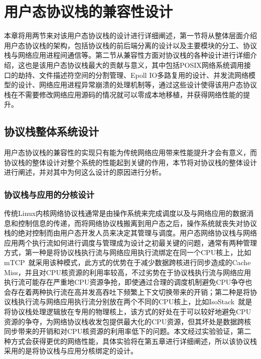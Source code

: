 \chapter{用户态协议栈的兼容性设计}

本章将用两节来对该用户态协议栈的设计进行详细阐述，第一节将从整体层面介绍用户态协议栈的架构，包括协议栈的前后端分离的设计以及主要模块的分工、协议栈与网络应用进程间通信等。第二节从兼容性方面对协议栈的各种设计进行详细介绍，这也是该用户态协议栈最大的贡献与意义，其中包括POSIX网络系统调用接口的劫持、文件描述符空间的分割管理、Epoll IO多路复用的设计、并发流网络模型的设计、网络应用进程异常崩溃的处理机制等，通过这些设计使得该用户态协议栈在不需要修改网络应用源码的情况就可以零成本地移植，并获得网络性能的提升。

\section{协议栈整体系统设计}

用户态协议栈的兼容性的实现只有能为传统网络应用带来性能提升才会有意义，而协议栈的整体设计对整个系统的性能起到关键的作用，本节将对协议栈的整体设计进行阐述，并对其中为何这么设计的原因进行分析。

\subsection{协议栈与应用的分核设计}

传统Linux内核网络协议栈通常是由操作系统来完成调度以及与网络应用的数据消息和控制信息的传递，而将网络协议栈搬离到用户态之后，操作系统就丧失对协议栈的绝对控制而由用户态开发人员来决定其管理与调度。用户态网络协议栈与网络应用两个执行流如何进行调度与管理成为设计之初最关键的问题，通常有两种管理方式，第一种是将协议栈执行流与网络应用执行流绑定在同一个CPU核上，比如mTCP~\cite{mTCP}就采用该种模式，此方式的优势在于减少数据跨核进行同步造成的Cache Miss，并且对CPU核资源的利用率较高，不过劣势在于协议栈执行流与网络应用执行流可能存在严重地CPU资源争抢，即使通过合理的调度机制避免CPU争夺也会存在着两种执行流在高并发高吞吐下频繁上下文切换带来的开销；第二种是将协议栈执行流与网络应用执行流分别放在两个不同的CPU核上，比如IsoStack~\cite{IsoStack}就是将协议栈处理逻辑放在专用的物理核上，该方式的好处在于可以较好地避免CPU资源的争夺，为网络协议栈收发包提供最大化的CPU资源，但其坏处是数据跨核同步带来的开销和对CPU核资源的利用率低下的问题。本文经过实验验证，第二种方式会获得更优的网络性能，具体实验将在第五章进行详细阐述，所以该协议栈采用的是将协议栈与应用分核绑定的设计。

